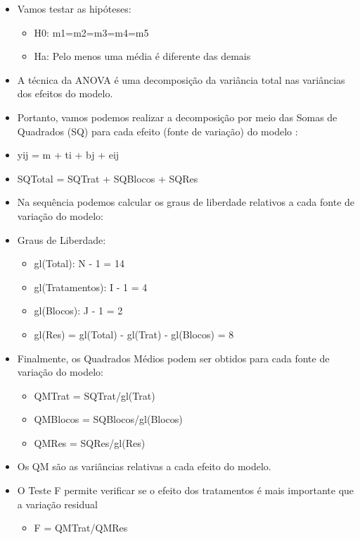 \documentclass[
]{book}
\providecommand{\tightlist}{%
  \setlength{\itemsep}{0pt}\setlength{\parskip}{0pt}}
\begin{document}
\begin{itemize}
\item
  Vamos testar as hipóteses:

  \begin{itemize}
  \tightlist
  \item
    H0: m1=m2=m3=m4=m5
  \item
    Ha: Pelo menos uma média é diferente das demais
  \end{itemize}
\item
  A técnica da ANOVA é uma decomposição da variância total nas variâncias dos efeitos do modelo.
\item
  Portanto, vamos podemos realizar a decomposição por meio das Somas de Quadrados (SQ) para cada efeito (fonte de variação) do modelo :
\item
  yij = m + ti + bj + eij
\item
  SQTotal = SQTrat + SQBlocos + SQRes
\item
  Na sequência podemos calcular os graus de liberdade relativos a cada fonte de variação do modelo:
\item
  Graus de Liberdade:

  \begin{itemize}
  \tightlist
  \item
    gl(Total): N - 1 = 14
  \item
    gl(Tratamentos): I - 1 = 4
  \item
    gl(Blocos): J - 1 = 2
  \item
    gl(Res) = gl(Total) - gl(Trat) - gl(Blocos) = 8
  \end{itemize}
\item
  Finalmente, os Quadrados Médios podem ser obtidos para cada fonte de variação do modelo:

  \begin{itemize}
  \tightlist
  \item
    QMTrat = SQTrat/gl(Trat)
  \item
    QMBlocos = SQBlocos/gl(Blocos)
  \item
    QMRes = SQRes/gl(Res)
  \end{itemize}
\item
  Os QM são as variâncias relativas a cada efeito do modelo.
\item
  O Teste F permite verificar se o efeito dos tratamentos é mais importante que a variação residual

  \begin{itemize}
  \tightlist
  \item
    F = QMTrat/QMRes
  \end{itemize}
\end{itemize}
\end{document}
